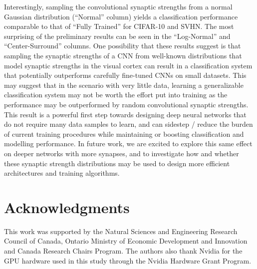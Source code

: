\documentclass[10pt,letterpaper]{article}
\begin{document}
Interestingly, sampling the convolutional synaptic strengths from a normal Gaussian distribution (``Normal'' column) yields a classification performance comparable to that of ``Fully Trained'' for CIFAR-10 and SVHN. The most surprising of the preliminary results can be seen in the ``Log-Normal'' and ``Center-Surround'' columns. One possibility that these results suggest is that sampling the synaptic strengths of a CNN from well-known distributions that model synaptic strengths in the visual cortex can result in a classification system that potentially outperforms carefully fine-tuned CNNs on small datasets.  This may suggest that in the scenario with very little data, learning a generalizable classification system may not be worth the effort put into training as the performance may be outperformed by random convolutional synaptic strengths.  This result is a powerful first step towards designing deep neural networks that do not require many data samples to learn, and can sidestep / reduce the burden of current training procedures while maintaining or boosting classification and modelling performance. In future work, we are excited to explore this same effect on deeper networks with more synapses, and to investigate how and whether these synaptic strength distributions may be used to design more efficient architectures and training algorithms.


















\vspace{-1.5mm}
\section{Acknowledgments}
This work was supported by the Natural Sciences and Engineering Research Council of Canada, Ontario Ministry of Economic Development and Innovation and Canada Research Chairs Program. The authors also thank Nvidia for the GPU hardware used in this study through the Nvidia Hardware Grant Program.


\vspace{-4mm}


\setlength{\bibleftmargin}{.125in}
\setlength{\bibindent}{-\bibleftmargin}

% 
 
%
\end{document}
